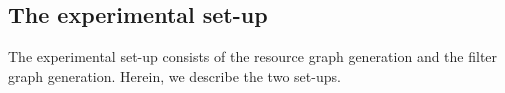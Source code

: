 



\subsection{The experimental set-up}
\label{sec:experimental-setup}

The experimental set-up consists of the resource graph generation and the
filter graph generation. Herein, we describe the two set-ups.

